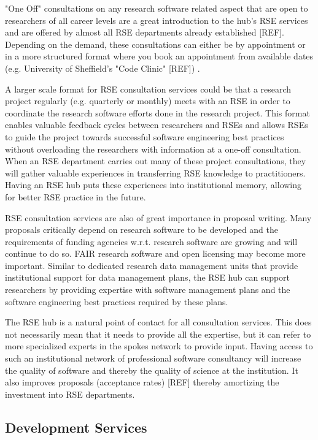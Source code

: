 \documentclass{article}
\begin{document}
"One Off" consultations on any research software related aspect that are open to researchers of all career levels are a great introduction to the hub's RSE services and are offered by almost all RSE departments already established [REF].
Depending on the demand, these consultations can either be by appointment or in a more structured format where you book an appointment from available dates (e.g. University of Sheffield's "Code Clinic" [REF]) .

A larger scale format for RSE consultation services could be that a research project regularly (e.g. quarterly or monthly) meets with an RSE in order to coordinate the research software efforts done in the research project.
This format enables valuable feedback cycles between researchers and RSEs and allows RSEs to guide the project towards successful software engineering best practices without overloading the researchers with information at a one-off consultation.
When an RSE department carries out many of these project consultations, they will gather valuable experiences in transferring RSE knowledge to practitioners.
Having an RSE hub puts these experiences into institutional memory, allowing for better RSE practice in the future.

RSE consultation services are also of great importance in proposal writing.
Many proposals critically depend on research software to be developed and the requirements of funding agencies w.r.t. research software are growing and will continue to do so.
FAIR research software and open licensing may become more important.
Similar to dedicated research data management units that provide institutional support for data management plans, the RSE hub can support researchers by providing expertise with software management plans and the software engineering best practices required by these plans.

The RSE hub is a natural point of contact for all consultation services.
This does not necessarily mean that it needs to provide all the expertise, but it can refer to more specialized experts in the spokes network to provide input.
Having access to such an institutional network of professional software consultancy will increase the quality of software and thereby the quality of science at the institution.
It also improves proposals (acceptance rates) [REF] thereby amortizing the investment into RSE departments.

\subsection{Development Services}
\end{document}
